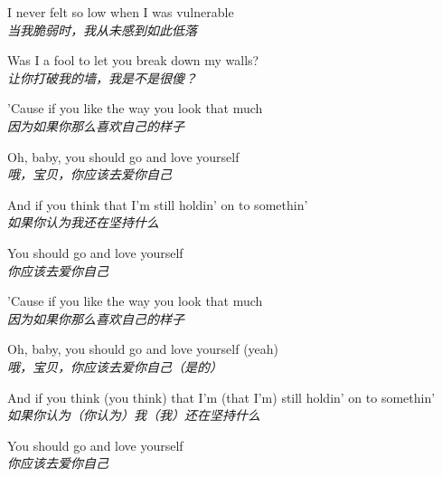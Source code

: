 \begin{spacing}{1.5}
\begin{flushleft}
I never felt so low when I was vulnerable\\
\textit{当我脆弱时，我从未感到如此低落}\lyricspace

Was I a fool to let you break down my walls?\\
\textit{让你打破我的墙，我是不是很傻？}\lyricspace

'Cause if you like the way you look that much\\
\textit{因为如果你那么喜欢自己的样子}\lyricspace

Oh, baby, you should go and love yourself\\
\textit{哦，宝贝，你应该去爱你自己}\lyricspace

And if you think that I'm still holdin' on to somethin'\\
\textit{如果你认为我还在坚持什么}\lyricspace

You should go and love yourself\\
\textit{你应该去爱你自己}\lyricspace

'Cause if you like the way you look that much\\
\textit{因为如果你那么喜欢自己的样子}\lyricspace

Oh, baby, you should go and love yourself (yeah)\\
\textit{哦，宝贝，你应该去爱你自己（是的）}\lyricspace

And if you think (you think) that I'm (that I'm) still holdin' on to somethin'\\
\textit{如果你认为（你认为）我（我）还在坚持什么}\lyricspace

You should go and love yourself\\
\textit{你应该去爱你自己}\lyricspace
\end{flushleft}
\end{spacing} 
